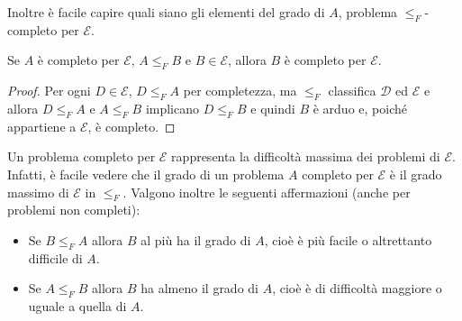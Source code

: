 Inoltre è facile capire quali siano gli elementi del grado di
$A$, problema $\leq_F$-completo per $\mathcal{E}$.

\begin{property}
	Se $A$ è completo per $\mathcal{E}$, $A \leq_F B$ e
	$B \in \mathcal{E}$, allora $B$ è completo per $\mathcal{E}$.
	\begin{proof}
		Per ogni $D \in \mathcal{E}$, $D \leq_F A$ per
		completezza, ma $\leq_F$ classifica $\mathcal{D}$ ed
		$\mathcal{E}$ e allora $D \leq_F A$ e $A \leq_F B$
		implicano $D \leq_F B$ e quindi $B$ è arduo e, poiché
		appartiene a $\mathcal{E}$, è completo.
	\end{proof}
\end{property}

Un problema completo per $\mathcal{E}$ rappresenta la difficoltà
massima dei problemi di $\mathcal{E}$. Infatti, è facile vedere
che il grado di un problema $A$ completo per $\mathcal{E}$ è il
grado massimo di $\mathcal{E}$ in  $\leq_F$. Valgono inoltre le
seguenti affermazioni (anche per problemi non completi):
\begin{itemize}
	\item Se $B \leq_F A$ allora $B$ al più ha il grado di $A$,
	      cioè è più facile o altrettanto difficile di $A$.
	\item Se $A \leq_F B$ allora $B$ ha almeno il grado di $A$,
	      cioè è di difficoltà maggiore o uguale a quella di $A$.
\end{itemize}